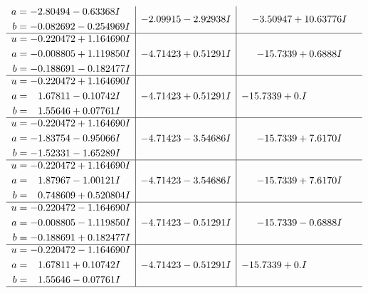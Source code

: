 \documentclass[1p]{elsarticle_modified}
\theoremstyle{definition}
\begin{document}
$$\begin{array}{c|c|c}
\begin{aligned}
a &= -2.80494 - 0.63368 I \\
b &= -0.082692 - 0.254969 I\end{aligned}
 & -2.09915 - 2.92938 I & -3.50947 + 10.63776 I \\ \hline\begin{aligned}
u &= -0.220472 + 1.164690 I \\
a &= -0.008805 + 1.119850 I \\
b &= -0.188691 - 0.182477 I\end{aligned}
 & -4.71423 + 0.51291 I & -15.7339 + 0.6888 I \\ \hline\begin{aligned}
u &= -0.220472 + 1.164690 I \\
a &= \phantom{-}1.67811 - 0.10742 I \\
b &= \phantom{-}1.55646 + 0.07761 I\end{aligned}
 & -4.71423 + 0.51291 I & -15.7339 + 0. I\phantom{ +0.000000I} \\ \hline\begin{aligned}
u &= -0.220472 + 1.164690 I \\
a &= -1.83754 - 0.95066 I \\
b &= -1.52331 - 1.65289 I\end{aligned}
 & -4.71423 - 3.54686 I & -15.7339 + 7.6170 I \\ \hline\begin{aligned}
u &= -0.220472 + 1.164690 I \\
a &= \phantom{-}1.87967 - 1.00121 I \\
b &= \phantom{-}0.748609 + 0.520804 I\end{aligned}
 & -4.71423 - 3.54686 I & -15.7339 + 7.6170 I \\ \hline\begin{aligned}
u &= -0.220472 - 1.164690 I \\
a &= -0.008805 - 1.119850 I \\
b &= -0.188691 + 0.182477 I\end{aligned}
 & -4.71423 - 0.51291 I & -15.7339 - 0.6888 I \\ \hline\begin{aligned}
u &= -0.220472 - 1.164690 I \\
a &= \phantom{-}1.67811 + 0.10742 I \\
b &= \phantom{-}1.55646 - 0.07761 I\end{aligned}
 & -4.71423 - 0.51291 I & -15.7339 + 0. I\phantom{ +0.000000I}\\
 \hline 
 \end{array}$$\newpage$$\begin{array}{c|c|c}  

\end{array}$$
\end{document}
